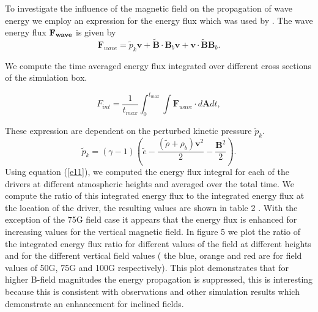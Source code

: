 \documentclass[linenumbers]{aastex63}
\begin{document}

To investigate the influence of the magnetic field on the propagation of wave energy we employ an expression for the energy flux which was used by \citet{Bogdan2003}. The wave energy flux $\bf{F}_{wave}$ is given by
$$
{\mathbf F}_{wave}=\tilde{p}_{k} {\mathbf v}+\tilde{\mathbf B}\cdot {\mathbf B_{b}}{\mathbf v}+{\mathbf v}\cdot \tilde{\mathbf B}{\mathbf B_{b}} .
$$

We compute the time averaged energy flux integrated over different cross sections of the simulation box.

\begin{equation}
F_{int}= \frac{1}{t_{max}} \int_{0}^{t_{max}} \int {\mathbf F}_{wave} \cdot d{\mathbf A}dt,
\label{e11}
\end{equation}

These expression are dependent on the perturbed kinetic pressure $\tilde{p}_{k}$.
$$
\tilde{p}_{k}=\left(\gamma - 1\right)\left( \tilde{e}-\frac{ \left( \tilde{\rho} +\rho_b \right){\mathbf v}^2}{2}-\frac{{\mathbf B}^2}{2}\right).
$$
Using equation (\ref{e11}), we computed the energy flux integral for each of the drivers at different atmospheric heights and averaged over the total time. We compute the ratio of this integrated energy flux to the integrated energy flux at the location of the driver, the resulting values are shown in table 2 . With the exception of the 75G field case it appears that the energy flux is enhanced for increasing values for the vertical magnetic field. In figure 5  we plot the ratio of the integrated energy flux ratio for different values of the field at different heights and for the different vertical field values ( the blue, orange and red  are for field values of 50G, 75G and 100G respectively). This plot demonstrates that for higher B-field magnitudes the energy propagation is suppressed, this is interesting because this is consistent with observations and other simulation results which demonstrate an enhancement for inclined fields.
\end{document}
